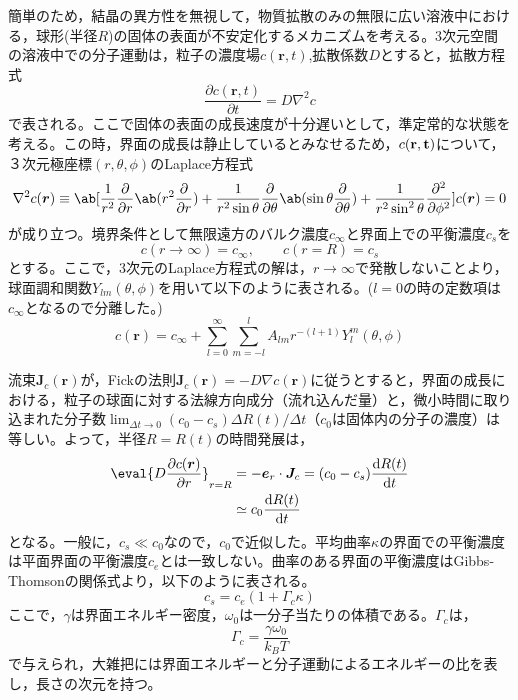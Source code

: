 \documentclass[autodetect-engine,dvi=dvipdfmx,a4paper,ja=standard,oneside,openany,11pt,draft]{bxjsbook}
\begin{document}
簡単のため，結晶の異方性を無視して，物質拡散のみの無限に広い溶液中における，球形(半径$R$)の固体の表面が不安定化するメカニズムを考える\cite{フラクタル科学}\cite{mullins1963morphological}。3次元空間の溶液中での分子運動は，粒子の濃度場$c(\bm{r},t)$,拡散係数$D$とすると，拡散方程式
\begin{equation}
  \frac{\partial c(\bm{r},t)}{\partial t} = D\nabla^2c
  \label{eq:diffusion}
\end{equation}
で表される。ここで固体の表面の成長速度が十分遅いとして，準定常的な状態を考える。この時，界面の成長は静止しているとみなせるため，$c(\bf{r},t)$について，３次元極座標$(r,\theta,\phi)$のLaplace方程式
\begin{equation}
  \nabla^2c(\bm{r})\equiv \ab[\frac{1}{r^2}\pdv*{\ab(r^2\pdv{}{r})}{r}+\frac{1}{r^2\sin\theta}\pdv*{\ab(\sin\theta\pdv{}{\theta})}{\theta}+\frac{1}{r^2\sin^2\theta}\pdv[2]{}{\phi}]c(\bm{r})=0
  \label{eq:laplace}
\end{equation}
が成り立つ。境界条件として無限遠方のバルク濃度$c_{\infty}$と界面上での平衡濃度$c_s$を
\begin{equation}
  c(r\rightarrow \infty)  = c_{\infty}, \qquad c(r=R)= c_s
  \label{eq:boundary}
\end{equation}
とする。ここで，3次元のLaplace方程式の解は，$r\to\infty$で発散しないことより，球面調和関数$Y_{lm}(\theta,\phi)$を用いて以下のように表される。($l=0$の時の定数項は$c_\infty$となるので分離した。)
\begin{equation}
  c(\bm{r}) = c_{\infty} + \sum_{l=0}^{\infty}\sum_{m=-l}^{l}A_{lm}r^{-(l+1)}Y_{l}^{m}(\theta,\phi)
  \label{eq:spherical}
\end{equation}

流束$\bm{J}_c(\bm{r})$が，Fickの法則$\bm{J}_c(\bm{r})=-D\nabla c(\bm{r})$に従うとすると，界面の成長における，粒子の球面に対する法線方向成分（流れ込んだ量）と，微小時間に取り込まれた分子数$\lim_{\Delta t\to 0} (c_0-c_s)\Delta R(t)/\Delta t$（$c_0$は固体内の分子の濃度）は等しい。よって，半径$R=R(t)$の時間発展は，
\begin{equation}
  \begin{split}
    \eval{D\pdv{c(\bm{r})}{r}}_{r=R} & = -\bm{e}_r\cdot\bm{J}_c = (c_0-c_s)\odv{R(t)}{t} \\
                                     & \simeq c_0\odv{R(t)}{t}
  \end{split}
  \label{eq:R}
\end{equation}
となる。一般に，$c_s\ll c_0$なので，$c_0$で近似した。平均曲率$\kappa$の界面での平衡濃度は平面界面の平衡濃度$c_e$とは一致しない。曲率のある界面の平衡濃度はGibbs-Thomsonの関係式より，以下のように表される。
\begin{equation}
  c_s = c_e(1+\Gamma_c \kappa)
  \label{eq:Gibbs-Thomson}
\end{equation}
ここで，$\gamma$は界面エネルギー密度，$\omega_0$は一分子当たりの体積である。$\Gamma_c$は，
\begin{equation}
  \Gamma_c = \frac{\gamma \omega_0}{k_BT}
\end{equation}
で与えられ，大雑把には界面エネルギーと分子運動によるエネルギーの比を表し，長さの次元を持つ。
\end{document}
